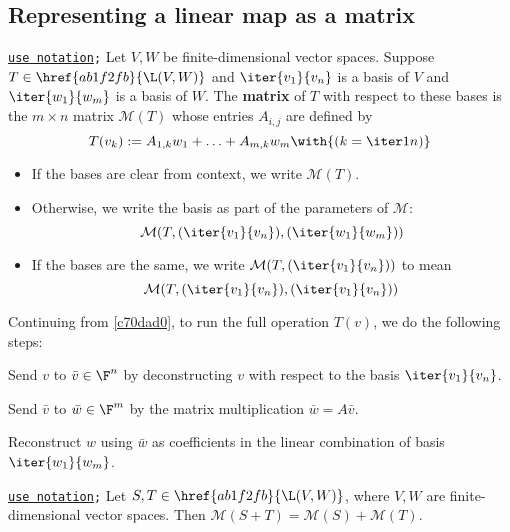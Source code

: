 \subsection{Representing a linear map as a matrix}\label{f3574c8}

\label{c70dad0}

\texttt{\href{d76dfe6}{use notation};} Let $V,W$ be finite-dimensional vector
spaces. Suppose $T\in\href{ab1f2fb}{\L(V,W)}$ and $\iter{v_1}{v_n}$ is a basis
of $V$ and $\iter{w_1}{w_m}$ is a basis of $W$. The \textbf{matrix} of $T$ with
respect to these bases is the $m\times n$ matrix $\mathcal M(T)$ whose entries
$A_{i,j}$ are defined by
$$
  T(v_k):=A_{1,k}w_1+\ldots+A_{m,k}w_m\with{(k=\iter1n)}
$$

\begin{itemize}
  \item If the bases are clear from context, we write $\mathcal M(T)$.
  \item Otherwise, we write the basis as part of the parameters of $\mathcal
        M$:
        $$
          \mathcal M(T,(\iter{v_1}{v_n}),(\iter{w_1}{w_m}))
        $$
  \item If the bases are the same, we write $\mathcal M(T,(\iter{v_1}{v_n}))$
        to mean
        $$
          \mathcal M(T,(\iter{v_1}{v_n}),(\iter{v_1}{v_n}))
        $$
\end{itemize}

\label{cae2265}

Continuing from \autoref{c70dad0}, to run the full operation $T(v)$, we do the
following steps:
\begin{enumerati}
  \item Send $v$ to $\bar v\in\F^n$ by deconstructing $v$ with respect to the
        basis $\iter{v_1}{v_n}$.
  \item Send $\bar v$ to $\bar w\in\F^m$ by the matrix multiplication $\bar
        w=A\bar v$.
  \item Reconstruct $w$ using $\bar w$ as coefficients in the linear
        combination of basis $\iter{w_1}{w_m}$.
\end{enumerati}

\label{abcf830}

\texttt{\href{d76dfe6}{use notation};} Let $S,T\in\href{ab1f2fb}{\L(V,W)}$,
where $V,W$ are finite-dimensional vector spaces. Then $\mathcal M(S+T)=\mathcal
M(S)+\mathcal M(T)$.

